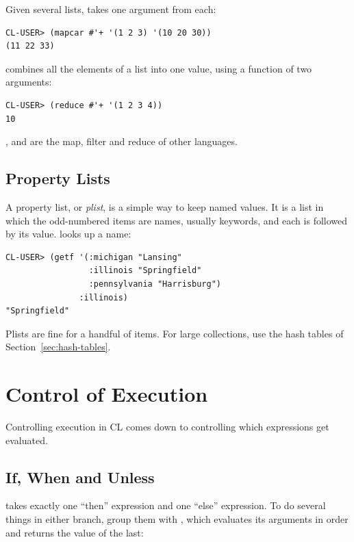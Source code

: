 Given several lists,  takes one argument from each:

\begin{verbatim}
CL-USER> (mapcar #'+ '(1 2 3) '(10 20 30))
(11 22 33)
\end{verbatim}

 combines all the elements of a list into one value,
using a function of two arguments:

\begin{verbatim}
CL-USER> (reduce #'+ '(1 2 3 4))
10
\end{verbatim}

,  and  are the map,
filter and reduce of other languages.

\subsection{Property Lists}

A property list, or \emph{plist}, is a simple way to keep named
values. It is a list in which the odd-numbered items are names,
usually keywords, and each is followed by its value. 
looks up a name:

\begin{verbatim}
CL-USER> (getf '(:michigan "Lansing"
                 :illinois "Springfield"
                 :pennsylvania "Harrisburg")
               :illinois)
"Springfield"
\end{verbatim}

Plists are fine for a handful of items. For large collections, use
the hash tables of Section~\ref{sec:hash-tables}.

\section{Control of Execution}

Controlling execution in CL comes down to controlling which
expressions get evaluated.

\subsection{If, When and Unless}

 takes exactly one ``then'' expression and one ``else''
expression. To do several things in either branch, group them with
, which evaluates its arguments in order and returns the
value of the last:

